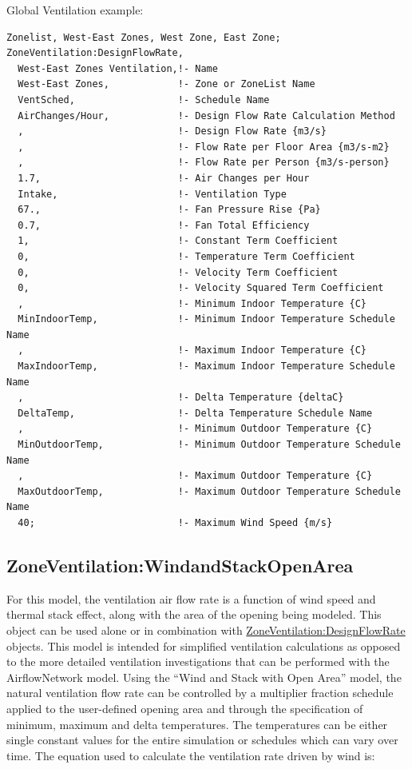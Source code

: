 Global Ventilation example:

\begin{lstlisting}
Zonelist, West-East Zones, West Zone, East Zone;
ZoneVentilation:DesignFlowRate,
  West-East Zones Ventilation,!- Name
  West-East Zones,            !- Zone or ZoneList Name
  VentSched,                  !- Schedule Name
  AirChanges/Hour,            !- Design Flow Rate Calculation Method
  ,                           !- Design Flow Rate {m3/s}
  ,                           !- Flow Rate per Floor Area {m3/s-m2}
  ,                           !- Flow Rate per Person {m3/s-person}
  1.7,                        !- Air Changes per Hour
  Intake,                     !- Ventilation Type
  67.,                        !- Fan Pressure Rise {Pa}
  0.7,                        !- Fan Total Efficiency
  1,                          !- Constant Term Coefficient
  0,                          !- Temperature Term Coefficient
  0,                          !- Velocity Term Coefficient
  0,                          !- Velocity Squared Term Coefficient
  ,                           !- Minimum Indoor Temperature {C}
  MinIndoorTemp,              !- Minimum Indoor Temperature Schedule Name
  ,                           !- Maximum Indoor Temperature {C}
  MaxIndoorTemp,              !- Maximum Indoor Temperature Schedule Name
  ,                           !- Delta Temperature {deltaC}
  DeltaTemp,                  !- Delta Temperature Schedule Name
  ,                           !- Minimum Outdoor Temperature {C}
  MinOutdoorTemp,             !- Minimum Outdoor Temperature Schedule Name
  ,                           !- Maximum Outdoor Temperature {C}
  MaxOutdoorTemp,             !- Maximum Outdoor Temperature Schedule Name
  40;                         !- Maximum Wind Speed {m/s}
\end{lstlisting}

\subsection{ZoneVentilation:WindandStackOpenArea}\label{zoneventilationwindandstackopenarea}

For this model, the ventilation air flow rate is a function of wind speed and thermal stack effect, along with the area of the opening being modeled. This object can be used alone or in combination with \hyperref[zoneventilationdesignflowrate]{ZoneVentilation:DesignFlowRate} objects. This model is intended for simplified ventilation calculations as opposed to the more detailed ventilation investigations that can be performed with the AirflowNetwork model. Using the ``Wind and Stack with Open Area'' model, the natural ventilation flow rate can be controlled by a multiplier fraction schedule applied to the user-defined opening area and through the specification of minimum, maximum and delta temperatures. The temperatures can be either single constant values for the entire simulation or schedules which can vary over time. The equation used to calculate the ventilation rate driven by wind is:

